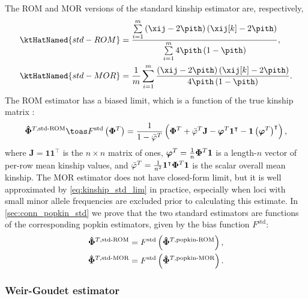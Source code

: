 \documentclass[11pt]{article}
\newcommand{\kinMat}[1][T]{%
  \ensuremath{%
    \mathbf{\Phi}^{#1}
  }%
  \xspace%
}%
\newcommand{\kinMatEstNamed}[1]{%
  \ensuremath{%
    \mathbf{\hat{\Phi}}^{T,\text{#1}}
  }%
  \xspace%
}%
\begin{document}
The ROM and MOR versions of the standard kinship estimator are, respectively,
\begin{align}
  \label{eq:kinship_std_rom}
  \ktHatNamed{std-ROM}
  &=
    \frac{
    \sum\limits_{i=1}^m \left( \xij - 2 \pith \right) \left( \xij[k] - 2 \pith \right)
    }{
    \sum\limits_{i=1}^m 4 \pith \left( 1-\pith \right)
    }
    , \\
  \label{eq:kinship_std_mor}
  \ktHatNamed{std-MOR}
  &=
    \frac{1}{m} \sum\limits_{i=1}^m \frac{\left( \xij - 2 \pith \right) \left( \xij[k] - 2 \pith \right)}{4 \pith \left( 1-\pith \right)}
    .
\end{align}
The ROM estimator has a biased limit, which is a function of the true kinship matrix \citep{ochoa_estimating_2021}:
\begin{equation}
  \label{eq:kinship_std_lim}
  \kinMatEstNamed{std-ROM}
  \toas
  F^\text{std} \left( \kinMat \right)
  =
  \frac{1}{1 - \bar{\varphi}^T}
  \left(
    \kinMat
    + \bar{\varphi}^T \mathbf{J}
    - \boldsymbol{\varphi}^T \mathbf{1}^\intercal 
    - \mathbf{1} \left( \boldsymbol{\varphi}^T \right)^\intercal 
  \right)
  ,
\end{equation}
where
$\mathbf{J} = \mathbf{1} \mathbf{1}^\intercal$ is the $n \times n$ matrix of ones,
$\boldsymbol{\varphi}^T = \frac{1}{n} \kinMat \mathbf{1}$ is a length-$n$ vector of per-row mean kinship values, and
$\bar{\varphi}^T = \frac{1}{n^2} \mathbf{1}^\intercal \kinMat \mathbf{1}$ is the scalar overall mean kinship.
The MOR estimator does not have closed-form limit, but it is well approximated by \cref{eq:kinship_std_lim} in practice, especially when loci with small minor allele frequencies are excluded prior to calculating this estimate.
In \cref{sec:conn_popkin_std} we prove that the two standard estimators are functions of the corresponding popkin estimators, given by the bias function $F^\text{std}$:
\begin{align*}
  \kinMatEstNamed{std-ROM}
  &=
    F^\text{std} \left( \kinMatEstNamed{popkin-ROM} \right)
    , \\
  \kinMatEstNamed{std-MOR}
  &=
    F^\text{std} \left( \kinMatEstNamed{popkin-MOR} \right)
    .
\end{align*}

\subsubsection{Weir-Goudet estimator}
\end{document}
